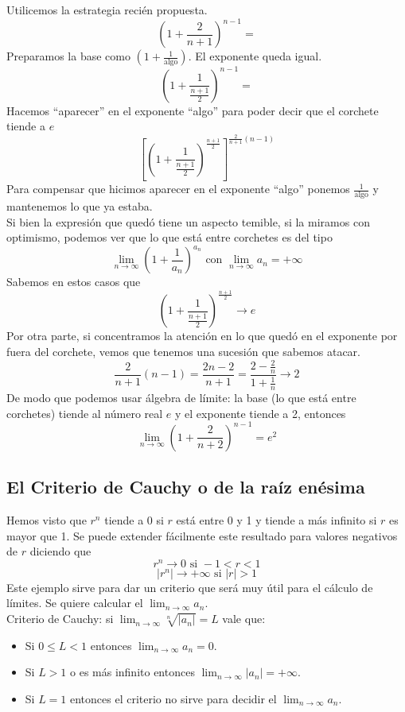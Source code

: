 \documentclass[../Teoría.root.tex]{subfiles}
\begin{document}
Utilicemos la estrategia recién propuesta.
\[\left(1+\frac{2}{n+1}\right)^{n-1}=\]
Preparamos la base como \(\left(1+\frac{1}{\text{algo}}\right)\).
El exponente queda igual.
\[\left(1+\frac{1}{\frac{n+1}{2}}\right)^{n-1}=\]
Hacemos ``aparecer'' en el exponente ``algo'' para poder decir que el corchete tiende a \(e\)
\[\left[\left(1+\frac{1}{\frac{n+1}{2}}\right)^{\frac{n+1}{2}}\right]^{\frac{2}{n+1}(n-1)}\]
Para compensar que hicimos aparecer en el exponente ``algo'' ponemos \(\frac{1}{\text{algo}}\) y mantenemos lo que ya estaba.\\
Si bien la expresión que quedó tiene un aspecto temible, si la miramos con optimismo, podemos ver que lo que está entre corchetes es del tipo
\[\lim_{n\to\infty}\left(1+\frac{1}{a_n}\right)^{a_n}\text{ con }\lim_{n\to\infty}a_n=+\infty\]
Sabemos en estos casos que
\[\left(1+\frac{1}{\frac{n+1}{2}}\right)^{\frac{n+1}{2}}\rightarrow e\]
Por otra parte, si concentramos la atención en lo que quedó en el exponente por fuera del corchete, vemos que tenemos una sucesión que sabemos atacar.
\[\frac{2}{n+1}(n-1)=\frac{2n-2}{n+1}=\frac{2-\frac{2}{n}}{1+\frac{1}{n}}\rightarrow2\]
De modo que podemos usar álgebra de límite:
la base (lo que está entre corchetes) tiende al número real \(e\) y el exponente tiende a 2, entonces
\[\lim_{n\to\infty}\left(1+\frac{2}{n+2}\right)^{n-1}=e^2\]
\subsection{El Criterio de Cauchy o de la raíz enésima}
Hemos visto que \(r^n\) tiende a 0 si \(r\) está entre 0 y 1 y tiende a más infinito si \(r\) es mayor que 1.
Se puede extender fácilmente este resultado para valores negativos de \(r\) diciendo que
\[r^n\rightarrow0\text{ si }-1<r<1\]
\[|r^n|\rightarrow+\infty\text{ si }|r|>1\]
Este ejemplo sirve para dar un criterio que será muy útil para el cálculo de límites.
Se quiere calcular el \(\lim_{n\to\infty}a_n\).\\
Criterio de Cauchy: si \(\lim_{n\to\infty}\sqrt[n]{|a_n|}=L\) vale que:
\begin{itemize}
    \item Si \(0\leq L<1\) entonces \(\lim_{n\to\infty}a_n=0\).
    \item Si \(L>1\) o es más infinito entonces \(\lim_{n\to\infty}|a_n|=+\infty\).
    \item Si \(L=1\) entonces el criterio no sirve para decidir el \(\lim_{n\to\infty}a_n\).
\end{itemize}
\end{document}
